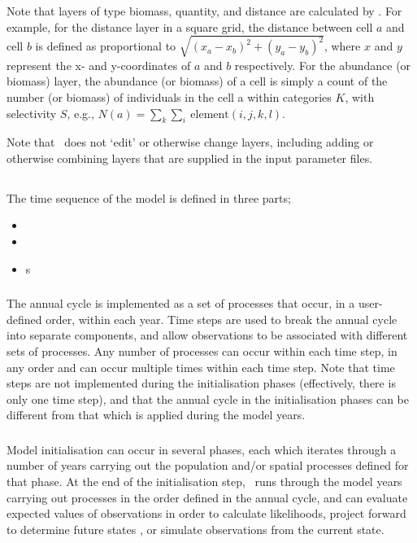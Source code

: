 Note that layers of type biomass, quantity, and distance are calculated by \SPM. For example, for the distance layer in a square grid, the distance between cell $a$ and cell $b$ is defined as proportional to $\sqrt{(x_a-x_b)^2 +(y_a-y_b)^2}$, where $x$ and $y$ represent the x- and y-coordinates of $a$ and $b$ respectively. For the abundance (or biomass) layer, the abundance (or biomass) of a cell is simply a count of the number (or biomass) of individuals in the cell a within categories $K$, with selectivity $S$, e.g., $N(a)=\sum_k \sum_i \ \text{element}(i,j,k,l)$.

Note that \SPM\ does not `edit' or otherwise change layers, including adding or otherwise combining layers that are supplied in the input parameter files.

\subsection{}

The time sequence of the model is defined in three parts;
\begin{itemize}
  \item {}
  \item {}
  \item {}s
\end{itemize}

\subsubsection{}

The annual cycle is implemented as a set of processes that occur, in a user-defined order, within each year. Time steps are used to break the annual cycle into separate components, and allow observations to be associated with different sets of processes. Any number of processes can occur within each time step, in any order and can occur multiple times within each time step. Note that time steps are not implemented during the initialisation phases (effectively, there is only one time step), and that the annual cycle in the initialisation phases can be different from that which is applied during the model years.

\subsubsection{}

Model initialisation can occur in several phases, each which iterates through a number of years carrying out the population and/or spatial processes defined for that phase. At the end of the initialisation step, \SPM\ runs through the model years carrying out processes in the order defined in the annual cycle, and can evaluate expected values of observations in order to calculate likelihoods, project forward to determine future states \NYI, or simulate observations from the current state.

